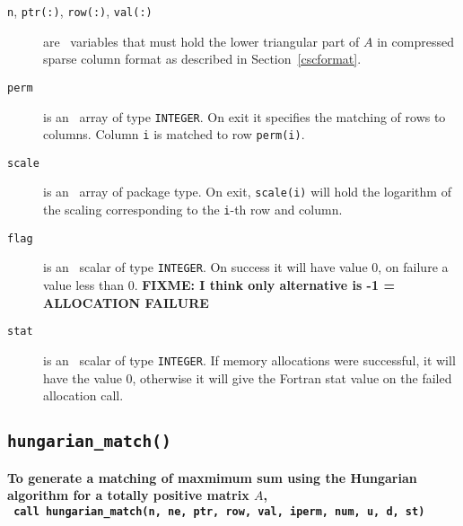 \begin{description}

\item[\texttt{n}, \texttt{ptr(:)}, \texttt{row(:)}, \texttt{val(:)}] are \intentin\ variables that must hold the lower triangular part of $A$ in compressed sparse column format as described in Section~\ref{cscformat}.

\item[\texttt{perm}] is an \intentout\ array of type {\tt INTEGER}. On exit it
specifies the matching of rows to columns. Column \texttt{i} is matched to row
\texttt{perm(i)}.

\item[\texttt{scale}] is an \intentout\ array of package type. On exit,
\texttt{scale(i)} will hold the logarithm of the scaling corresponding to the
\texttt{i}-th row and column.

\item[\texttt{flag}] is an \intentout\ scalar of type {\tt INTEGER}. On success it will have value 0, on failure a value less than 0. \textbf{FIXME: I think only alternative is -1 = ALLOCATION FAILURE}

\item[\texttt{stat}] is an \intentout\ scalar of type {\tt INTEGER}. If memory allocations were successful, it will have the value 0, otherwise it will give the
Fortran stat value on the failed allocation call.

\end{description}

\subsection{\texttt{hungarian\_match()}}

\textbf{\noindent
   To generate a matching of maxmimum sum using the Hungarian algorithm for a totally positive matrix $A$,
   \vspace*{0.1cm} \\
   \texttt{ \hspace*{0.2cm}
      call hungarian\_match(n, ne, ptr, row, val, iperm, num, u, d, st)
   }
   \vspace{0.3cm}
}

